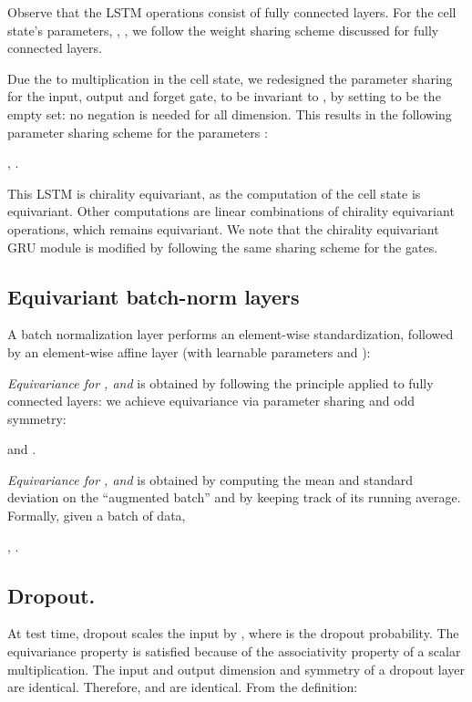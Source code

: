 \documentclass{article}
\begin{document}
Observe that the LSTM operations consist of fully connected layers. For the cell state's parameters, \eg, , we  follow the weight sharing scheme discussed for fully connected layers. 

Due the to multiplication in the cell state, we redesigned the parameter sharing for the input, output and forget gate, to be invariant to , by setting   to be the empty set: no negation is needed for all dimension. This results in the following parameter sharing scheme for the parameters :
\begin{center}
,
.
\end{center}
This LSTM is chirality equivariant, as  the computation of the cell state is equivariant. Other computations are linear combinations of chirality equivariant operations, which remains equivariant. We note that the chirality equivariant GRU module  is modified by following the same sharing scheme for the gates.

\subsection{Equivariant batch-norm layers}
A batch normalization layer performs an element-wise standardization, followed by an element-wise affine layer (with learnable parameters  and ): 

\textit{Equivariance for , and } is obtained by 
following the  principle applied to fully connected layers: we achieve equivariance via parameter sharing and odd symmetry:
\begin{center}

and 
.
\end{center}

\textit{Equivariance for , and } is obtained by
computing the mean and standard deviation on the ``augmented batch'' and by keeping track of its running average. Formally, given a batch  of data,
\begin{center}
, \hspace{0.1cm} .
\end{center}
\subsection{Dropout.}
At test time, dropout scales the input by , where  is the dropout probability. The equivariance property is satisfied because of  the associativity property of a scalar multiplication. 
The input and output dimension and symmetry of a dropout layer are identical. Therefore,  and  are identical. From the definition:
\end{document}

